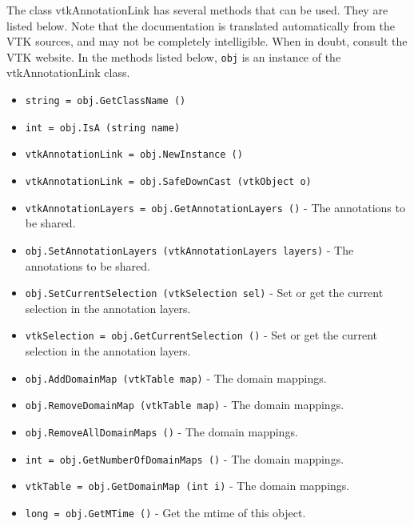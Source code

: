 The class vtkAnnotationLink has several methods that can be used.
  They are listed below.
Note that the documentation is translated automatically from the VTK sources,
and may not be completely intelligible.  When in doubt, consult the VTK website.
In the methods listed below, \verb|obj| is an instance of the vtkAnnotationLink class.
\begin{itemize}
\item  \verb|string = obj.GetClassName ()|

\item  \verb|int = obj.IsA (string name)|

\item  \verb|vtkAnnotationLink = obj.NewInstance ()|

\item  \verb|vtkAnnotationLink = obj.SafeDownCast (vtkObject o)|

\item  \verb|vtkAnnotationLayers = obj.GetAnnotationLayers ()| -  The annotations to be shared.

\item  \verb|obj.SetAnnotationLayers (vtkAnnotationLayers layers)| -  The annotations to be shared.

\item  \verb|obj.SetCurrentSelection (vtkSelection sel)| -  Set or get the current selection in the annotation layers.

\item  \verb|vtkSelection = obj.GetCurrentSelection ()| -  Set or get the current selection in the annotation layers.

\item  \verb|obj.AddDomainMap (vtkTable map)| -  The domain mappings.

\item  \verb|obj.RemoveDomainMap (vtkTable map)| -  The domain mappings.

\item  \verb|obj.RemoveAllDomainMaps ()| -  The domain mappings.

\item  \verb|int = obj.GetNumberOfDomainMaps ()| -  The domain mappings.

\item  \verb|vtkTable = obj.GetDomainMap (int i)| -  The domain mappings.

\item  \verb|long = obj.GetMTime ()| -  Get the mtime of this object.

\end{itemize}
